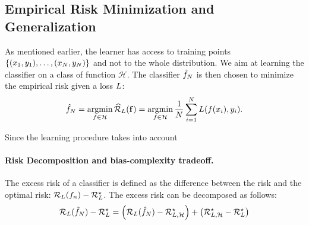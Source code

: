 
\subsection{Empirical Risk Minimization and Generalization}

As mentioned earlier, the learner has access to training points  $\{(x_1,y_1),\dots,(x_N,y_N)\}$ and not to the whole distribution. We aim at learning the classifier on a class of function $\mathcal{H}$. The classifier $\hat{f}_N $ is then chosen to minimize the empirical risk given a loss $L$:
\begin{align*}
    \hat{f}_N = \operatorname*{argmin}_{f\in\mathcal{H}}\widehat{\mathcal{R}}_{L}(\mathbf{f})= \operatorname*{argmin}_{f\in\mathcal{H}}\frac{1}{N}\sum_{i=1}^N L(f(x_i),y_i).
\end{align*}

Since the learning procedure takes into account 


\paragraph*{Risk Decomposition and bias-complexity tradeoff.} The excess risk of a classifier is defined as the difference between the risk and the optimal risk: $\mathcal{R}_L(f_n) - \mathcal{R}_L^\star$. The excess risk can be decomposed as follows:
\begin{align*}
    \risk_\loss( \hat{f}_\numsamples) - \risk_\loss^\star = \left(\risk_\loss( \hat{f}_\numsamples) - \risk_{\loss,\mathcal{H}}^\star\right)+ \left(\risk_{\loss,\mathcal{H}}^\star - \risk_\loss^\star\right)
\end{align*}


